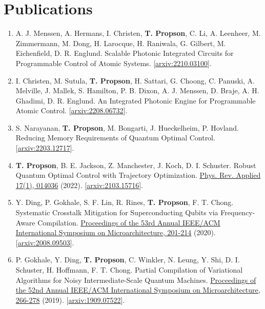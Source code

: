 \documentclass[letterpaper, 11pt]{article}
\begin{document}
\section{Publications}
\begin{enumerate}
\item A. J. Menssen, A. Hermans, I. Christen, \textbf{T. Propson}, C. Li, A. Leenheer,
  M. Zimmermann, M. Dong, H. Larocque, H. Raniwala, G. Gilbert, M. Eichenfield, D. R. Englund.
  Scalable Photonic Integrated Circuits for Programmable Control of Atomic Systems.
  [\href{https://arxiv.org/abs/2210.03100}{arxiv:2210.03100}].
\item I. Christen, M. Sutula, \textbf{T. Propson}, H. Sattari, G. Choong, C. Panuski, A. Melville, J. Mallek,
  S. Hamilton, P. B. Dixon, A. J. Menssen, D. Braje, A. H. Ghadimi, D. R. Englund.
  An Integrated Photonic Engine for Programmable Atomic Control.
  [\href{https://arxiv.org/abs/2208.06732}{arxiv:2208.06732}].
\item S. Narayanan, \textbf{T. Propson}, M. Bongarti, J. Hueckelheim, P. Hovland.
  Reducing Memory Requirements of Quantum Optimal Control.
  [\href{https://arxiv.org/abs/2203.12717}{arxiv:2203.12717}].
\item \textbf{T. Propson}, B. E. Jackson, Z. Manchester, J. Koch, D. I. Schuster. Robust Quantum
  Optimal Control with Trajectory Optimization.
  \href{https://journals.aps.org/prapplied/abstract/10.1103/PhysRevApplied.17.014036}{
    Phys. Rev. Applied 17(1), 014036} (2022).
  [\href{https://arxiv.org/abs/2103.15716}{arxiv:2103.15716}].
\item Y. Ding, P. Gokhale, S. F. Lin, R. Rines, \textbf{T. Propson}, F. T. Chong.
  Systematic Crosstalk Mitigation for Superconducting Qubits via Frequency-Aware Compilation.
  \href{https://ieeexplore.ieee.org/document/9251858}{Proceedings of the 53rd Annual
  IEEE/ACM International Symposium on Microarchitecture, 201-214} (2020).
       [\href{https://arxiv.org/abs/2008.09503}{arxiv:2008.09503}].
\item P. Gokhale, Y. Ding, \textbf{T. Propson}, C. Winkler, N. Leung, Y. Shi,
  D. I. Schuster, H. Hoffmann, F. T. Chong.
  Partial Compilation of Variational Algorithms for Noisy Intermediate-Scale Quantum Machines.
  \href{https://doi.org/10.1145/3352460.3358313}{Proceedings of the 52nd Annual
    IEEE/ACM International Symposium on Microarchitecture, 266-278} (2019).
       [\href{https://arxiv.org/abs/1909.07522}{arxiv:1909.07522}].
\end{enumerate}
\end{document}
